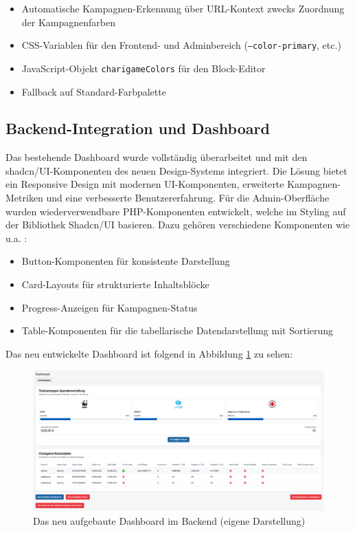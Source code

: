\begin{itemize}
    \item Automatische Kampagnen-Erkennung über URL-Kontext zwecks Zuordnung der Kampagnenfarben
    \item CSS-Variablen für den Frontend- und Adminbereich (\texttt{--color-primary}, etc.)
    \item JavaScript-Objekt \texttt{charigameColors} für den Block-Editor
    \item Fallback auf Standard-Farbpalette
\end{itemize}

\subsection{Backend-Integration und Dashboard}

Das bestehende Dashboard wurde vollständig überarbeitet und mit den shadcn/UI-Komponenten des neuen Design-Systems integriert.
Die Lösung bietet ein Responsive Design mit modernen UI-Komponenten, erweiterte Kampagnen-Metriken und eine verbesserte Benutzererfahrung.
Für die Admin-Oberfläche wurden wiederverwendbare PHP-Komponenten entwickelt, welche im Styling auf der Bibliothek Shadcn/UI basieren.
Dazu gehören verschiedene Komponenten wie u.a. :
\begin{itemize}
    \item Button-Komponenten für konsistente Darstellung
    \item Card-Layouts für strukturierte Inhaltsblöcke
    \item Progress-Anzeigen für Kampagnen-Status
    \item Table-Komponenten für die tabellarische Datendarstellung mit Sortierung
\end{itemize}
Das neu entwickelte Dashboard ist folgend in Abbildung \ref{fig:new-dashboard-backend} zu sehen:

\begin{figure}[H]
    \centering
    \includegraphics[width=1\textwidth]{images/new_dashboard_backend}
    \caption{Das neu aufgebaute Dashboard im Backend (eigene Darstellung)}
    \label{fig:new-dashboard-backend}
\end{figure}

